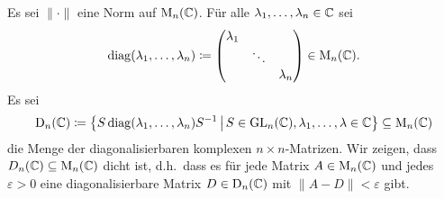 \documentclass[a4paper,10pt]{scrartcl}
\begin{document}
\begin{question}
  Es sei $\|\cdot\|$ eine Norm auf $\operatorname{M}_n(\mathbb{C})$.
  Für alle $\lambda_1, \dotsc, \lambda_n \in \mathbb{C}$ sei
  \[
    \operatorname{\operatorname{diag}}(\lambda_1, \dotsc, \lambda_n)
    \coloneqq
    \begin{pmatrix}
      \lambda_1 &         &           \\
                & \ddots  &           \\
                &         & \lambda_n
    \end{pmatrix}
    \in \operatorname{M}_n(\mathbb{C}).
  \]
  Es sei
  \[
    \operatorname{D}_n(\mathbb{C})
    \coloneqq
    \left\{
      S \operatorname{\operatorname{diag}}(\lambda_1, \dotsc, \lambda_n) S^{-1}
    \,\middle|\,
      S \in \operatorname{GL}_n(\mathbb{C}),
      \lambda_1, \dotsc, \lambda \in \mathbb{C}
    \right\}
    \subseteq \operatorname{M}_n(\mathbb{C})
  \]
  die Menge der diagonalisierbaren komplexen $n \times n$-Matrizen.
  Wir zeigen, dass $D_n(\mathbb{C}) \subseteq \operatorname{M}_n(\mathbb{C})$ dicht ist, d.h.\ dass es für jede Matrix $A \in \operatorname{M}_n(\mathbb{C})$ und jedes $\varepsilon > 0$ eine diagonalisierbare Matrix $D \in \operatorname{D}_n(\mathbb{C})$ mit $\|A-D\| < \varepsilon$ gibt.
  

\end{question}
\end{document}
